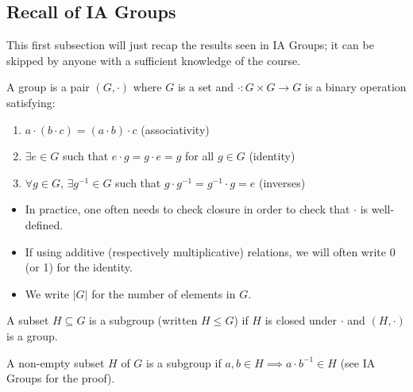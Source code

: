 \documentclass[egregdoesnotlikesansseriftitles,a4paper]{scrartcl}
\begin{document}
\subsection{Recall of IA Groups}
This first subsection will just recap the results seen in IA Groups; it can be skipped by anyone with a sufficient knowledge of the course.
\begin{definition*}[Group]
     A group is a pair $(G, \cdot)$ where $G$ is a set and $\cdot: G \times G \rightarrow  G$ is a binary operation satisfying:
     \begin{enumerate}
         \item $a \cdot (b \cdot c)=(a \cdot b)\cdot c$ (associativity)
         \item $\exists e \in G$ such that $e \cdot g= g \cdot e =g$ for all $g \in G$ (identity)
         \item $\forall g \in G$, $\exists {g}^{-1} \in G$ such that $g \cdot {g}^{-1}={g}^{-1}\cdot g=e$ (inverses)
     \end{enumerate}
\end{definition*}
\begin{remarks}\hfill
     \begin{itemize}
         \item In practice, one often needs to check closure in order to check that $\cdot $ is well-defined.
         \item If using additive (respectively multiplicative) relations, we will often write 0 (or 1) for the identity.
         \item We write $|G|$ for the number of elements in $G$.
     \end{itemize}
\end{remarks}
\begin{definition*}[Subgroup]
     A subset $H \subseteq G$ is a subgroup (written $H \leq G$) if $H$ is closed under $\cdot$ and $(H, \cdot)$ is a group.
\end{definition*}
\begin{remark}
     A non-empty subset $H$ of $G$ is a subgroup if $a,b \in H \implies a \cdot {b}^{-1} \in H$ (see IA Groups for the proof). 
\end{remark}
\end{document}
